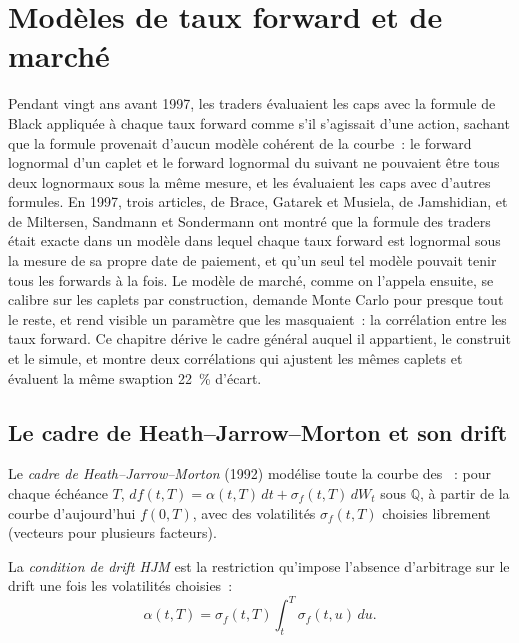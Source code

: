 \chapter{Modèles de taux forward et de marché}\label{ch:rc:forward-rate-and-market-models}

Pendant vingt ans avant 1997, les traders évaluaient les caps avec la formule de Black appliquée
à chaque taux forward comme s'il s'agissait d'une action, sachant que la formule provenait
d'aucun modèle cohérent de la courbe~: le forward lognormal d'un caplet et le
forward lognormal du suivant ne pouvaient être tous deux lognormaux sous la même
mesure, et les  évaluaient les caps avec d'autres formules. En 1997, trois
articles, de Brace, Gatarek et Musiela, de Jamshidian, et de Miltersen,
Sandmann et Sondermann ont montré que la formule des traders était exacte dans
un modèle dans lequel chaque taux forward est lognormal sous la mesure de sa propre
date de paiement, et qu'un seul tel modèle pouvait tenir tous les forwards à la fois. Le
modèle de marché, comme on l'appela ensuite, se calibre sur les caplets par construction,
demande Monte Carlo pour presque tout le reste, et rend visible un paramètre que les
 masquaient~: la corrélation entre les taux forward. Ce chapitre
dérive le cadre général auquel il appartient, le construit et le simule, et montre
deux corrélations qui ajustent les mêmes caplets et évaluent la même swaption 22~\%
d'écart.

\section{Le cadre de Heath--Jarrow--Morton et son drift}

\begin{definition}\label{def:rc:forward-rate-and-market-models:hjm}
Le \emph{cadre de Heath--Jarrow--Morton}
(1992) modélise toute la courbe des ~: pour chaque échéance $T$,
$df(t,T) = \alpha(t,T)\,dt+\sigma_f(t,T)\,dW_t$ sous $\mathbb Q$, à partir de
la courbe d'aujourd'hui $f(0,T)$, avec des volatilités $\sigma_f(t,T)$ choisies librement (vecteurs
pour plusieurs facteurs).
\end{definition}

\begin{definition}\label{def:rc:forward-rate-and-market-models:drift}
La \emph{condition de drift HJM} est la restriction
qu'impose l'absence d'arbitrage sur le drift une fois les volatilités
choisies~:
\[
\alpha(t,T) = \sigma_f(t,T)\int_t^T\sigma_f(t,u)\,du .
\]
\end{definition}

